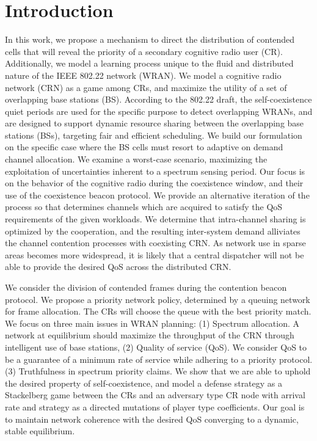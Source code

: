 \documentclass[10pt]{article}
\theoremstyle{definition}
\begin{document}
\section{Introduction}
In this work, we propose a mechanism to direct the distribution of contended
cells that will reveal the priority of a secondary cognitive radio user (CR).
Additionally, we model a learning process unique to the fluid and distributed
nature of the IEEE 802.22 network (WRAN). We model a cognitive radio network
(CRN) as a game among CRs, and maximize the utility of a set of overlapping base
stations (BS).
According to the 802.22 draft, the
self-coexistence quiet periods are used for the specific purpose to detect
overlapping WRANs, and are designed to support
dynamic resource sharing between the overlapping base stations (BSs), targeting
fair and efficient scheduling. We build our formulation on the specific case
where the BS cells must resort to adaptive on demand channel allocation. 
We examine a worst-case scenario, maximizing the
exploitation of uncertainties inherent to a spectrum sensing period.
Our focus is on the behavior of the cognitive radio during the
coexistence window, and their use of the coexistence beacon protocol. 
We provide an alternative
iteration of the process so that determines channels which are acquired to satisfy the
QoS requirements of the given workloads. We determine that intra-channel sharing
is optimized by the cooperation, and the resulting inter-system demand
alliviates the channel contention processes with coexisting CRN. 
As network use in sparse areas becomes more widespread, it is likely that a central dispatcher will not be able
to provide the desired QoS across the distributed CRN. 

We consider the division of contended frames during the contention beacon
protocol. We propose a priority network policy, determined by a queuing network for frame
allocation. The CRs will choose the queue with the best priority match. 
We focus on three main issues in WRAN planning: (1) Spectrum allocation. A
network at equilibrium should maximize the throughput of the CRN through
intelligent use of base stations, (2) Quality of service (QoS). We consider QoS
to be a guarantee of a minimum rate of service while adhering to a priority
protocol. (3) Truthfulness in spectrum priority claims. 
We show that we are able to uphold
the desired property of self-coexistence, and model
a defense strategy as a Stackelberg game between the CRs and an adversary type
CR node with arrival rate and strategy as a directed mutations
of player type coefficients. Our goal is to maintain network coherence 
with the desired QoS converging to a dynamic, stable equilibrium. 
\end{document}
